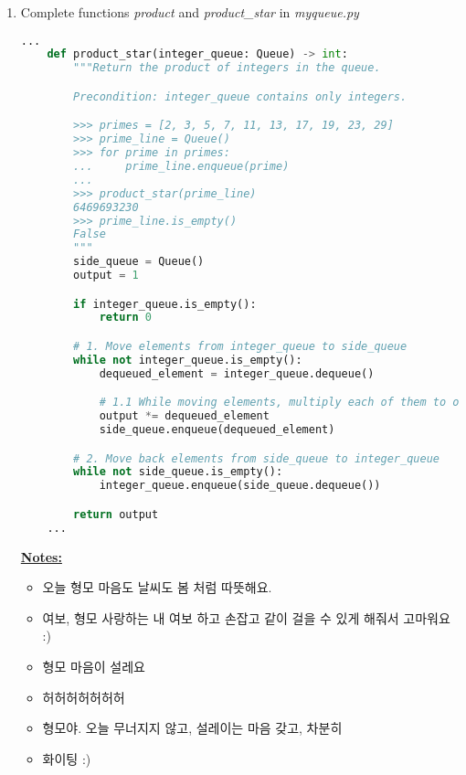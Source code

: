 \documentclass[12pt]{article}
\begin{document}
\begin{enumerate}[1.]
    \item Complete functions \textit{product} and \textit{product\_star} in \textit{myqueue.py}

    \bigskip

    \begin{lstlisting}[language=Python,caption={task\_2\_q2\_solution.py},captionpos=b]
    ...
    def product_star(integer_queue: Queue) -> int:
        """Return the product of integers in the queue.

        Precondition: integer_queue contains only integers.

        >>> primes = [2, 3, 5, 7, 11, 13, 17, 19, 23, 29]
        >>> prime_line = Queue()
        >>> for prime in primes:
        ...     prime_line.enqueue(prime)
        ...
        >>> product_star(prime_line)
        6469693230
        >>> prime_line.is_empty()
        False
        """
        side_queue = Queue()
        output = 1

        if integer_queue.is_empty():
            return 0

        # 1. Move elements from integer_queue to side_queue
        while not integer_queue.is_empty():
            dequeued_element = integer_queue.dequeue()

            # 1.1 While moving elements, multiply each of them to output.
            output *= dequeued_element
            side_queue.enqueue(dequeued_element)

        # 2. Move back elements from side_queue to integer_queue
        while not side_queue.is_empty():
            integer_queue.enqueue(side_queue.dequeue())

        return output
    ...
    \end{lstlisting}

    \bigskip

    \underline{\textbf{Notes:}}

    \bigskip

    \begin{itemize}
        \item 오늘 형모 마음도 날씨도 봄 처럼 따뜻해요.
        \item 여보, 형모 사랑하는 내 여보 하고 손잡고 같이 걸을 수 있게 해줘서 고마워요 :)
        \item 형모 마음이 설레요
        \item 허허허허허허허
        \item 형모야. 오늘 무너지지 않고, 설레이는 마음 갖고, 차분히
        \item 화이팅 :)
    \end{itemize}

\end{enumerate}
\end{document}
